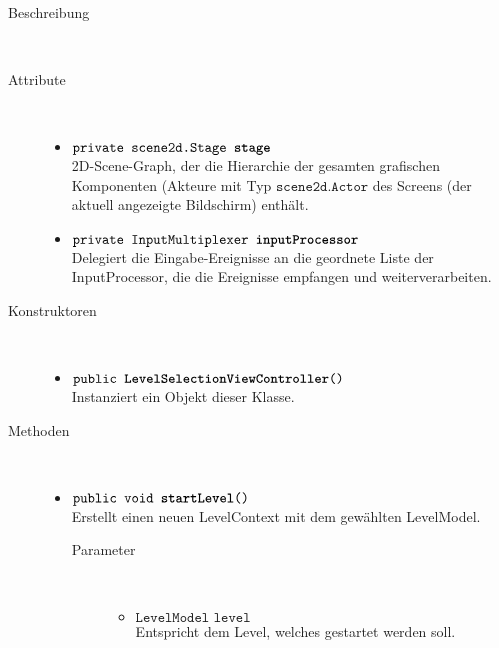 \begin{description}
\item[Beschreibung] \hfill \\ 
\item[Attribute] \hfill \\
	\vspace{-.8cm}
	\begin{itemize}	
		\item $\texttt{private scene2d.Stage \textbf{stage}}$ \\ 2D-Scene-Graph, der die Hierarchie der gesamten grafischen Komponenten (Akteure mit Typ $\texttt{scene2d.Actor}$ des Screens (der aktuell angezeigte Bildschirm) enthält. 
		\item $\texttt{private InputMultiplexer \textbf{inputProcessor}}$ \\ Delegiert die Eingabe-Ereignisse an die geordnete Liste der InputProcessor, die die Ereignisse empfangen und weiterverarbeiten.
		\end{itemize}
	
\item[Konstruktoren] \hfill \\
	\vspace{-.8cm}
	\begin{itemize}
		\item $\texttt{public \textbf{LevelSelectionViewController}()}$ \\ Instanziert ein Objekt dieser Klasse.

	\end{itemize}
	
\item[Methoden] \hfill \\
	\vspace{-.8cm}
	\begin{itemize}
		\item $\texttt{public void \textbf{startLevel}()}$ \\ Erstellt einen neuen LevelContext mit dem gewählten LevelModel.
			\begin{description}
			\item[Parameter] \hfill \\
			\vspace{-.8cm}
			\begin{itemize}
				\item $\texttt{LevelModel level}$ \\ Entspricht dem Level, welches gestartet werden soll.
			\end{itemize}
			\end{description}
			

		\end{itemize}
	\end{description}



